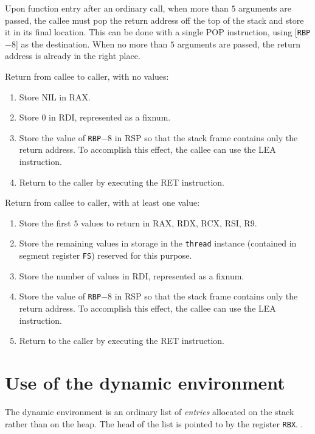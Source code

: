 Upon function entry after an ordinary call, when more than $5$
arguments are passed, the callee must pop the return address off the
top of the stack and store it in its final location.  This can be done
with a single POP instruction, using [\texttt{RBP}$ - 8$] as the
destination.  When no more than $5$ arguments are passed, the return
address is already in the right place.

Return from callee to caller, with no values:

\begin{enumerate}
\item Store NIL in RAX.
\item Store $0$ in RDI, represented as a fixnum.
\item Store the value of \texttt{RBP}$ - 8$ in RSP so that the stack frame
  contains only the return address.  To accomplish this effect, the
  callee can use the LEA instruction.
\item Return to the caller by executing the RET instruction.
\end{enumerate}

Return from callee to caller, with at least one value:

\begin{enumerate}
\item Store the first $5$ values to return in RAX, RDX, RCX, RSI, R9.
\item Store the remaining values in storage in the \texttt{thread}
  instance (contained in segment register \texttt{FS}) reserved for
  this purpose.
\item Store the number of values in RDI, represented as a fixnum.
\item Store the value of \texttt{RBP}$ - 8$ in RSP so that the stack frame
  contains only the return address.  To accomplish this effect, the
  callee can use the LEA instruction.
\item Return to the caller by executing the RET instruction.
\end{enumerate}

\section{Use of the dynamic environment}

The dynamic environment is an ordinary list of \emph{entries}
allocated on the stack rather than on the heap.  The head of the list
is pointed to by the register \texttt{RBX}.
.

